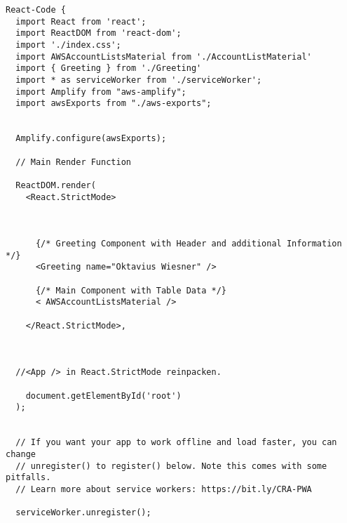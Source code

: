 

\begin{lstlisting}[caption={React Main Render Funktion index.js },
label=lst:Beispielcode 1,basicstyle=\ttfamily\small ] React-Code {
  import React from 'react';
  import ReactDOM from 'react-dom';
  import './index.css';
  import AWSAccountListsMaterial from './AccountListMaterial'
  import { Greeting } from './Greeting'
  import * as serviceWorker from './serviceWorker';
  import Amplify from "aws-amplify";
  import awsExports from "./aws-exports";


  Amplify.configure(awsExports);

  // Main Render Function

  ReactDOM.render(
    <React.StrictMode>



      {/* Greeting Component with Header and additional Information */}
      <Greeting name="Oktavius Wiesner" />

      {/* Main Component with Table Data */}
      < AWSAccountListsMaterial />

    </React.StrictMode>,



  //<App /> in React.StrictMode reinpacken.

    document.getElementById('root')
  );


  // If you want your app to work offline and load faster, you can change
  // unregister() to register() below. Note this comes with some pitfalls.
  // Learn more about service workers: https://bit.ly/CRA-PWA

  serviceWorker.unregister();

\end{lstlisting}
